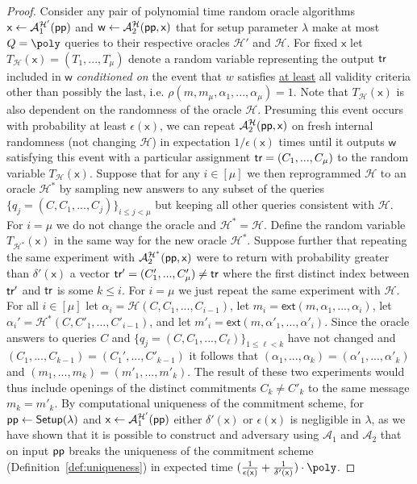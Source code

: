 \begin{proof} 
Consider any pair of polynomial time random oracle algorithms $\mathsf{x} \gets \mathcal{A}_1^{\mathcal{H}'}(\textsf{pp})$ 
and $\mathsf{w} \gets \mathcal{A}_2^{\mathcal{H}}(\textsf{pp}, \mathsf{x})$ that for setup parameter $\lambda$ make at most $Q = \poly$ queries to their respective oracles $\mathcal{H}'$ and $\mathcal{H}$. For fixed $\mathsf{x}$ let $T_\mathcal{H}(\mathsf{x}) = (T_1,...,T_\mu)$ denote a random variable representing the output $\textsf{{tr}}$ included in $\mathsf{w}$ \emph{conditioned on} the event that $w$ satisfies \underline{at least} all validity criteria other than possibly the last, i.e. $\rho(m, m_\mu, \alpha_1,...,\alpha_\mu) = 1$. Note that $T_\mathcal{H}(\mathsf{x})$ is also dependent on the randomness of the oracle $\mathcal{H}$. 
Presuming this event occurs with probability at least $\epsilon(\mathsf{x})$, we can repeat $\mathcal{A}_2^\mathcal{H}(\textsf{pp}, \mathsf{x})$ on fresh internal randomness (not changing $\mathcal{H}$) in expectation $1/\epsilon(\mathsf{x})$ times until it outputs $\mathsf{w}$ satisfying this event with a particular assignment $\textsf{{tr}} = (C_1,...,C_\mu)$ to the random variable $T_\mathcal{H}(\mathsf{x})$. Suppose that for any $i \in [\mu]$ we then reprogrammed $\mathcal{H}$ to an oracle $\mathcal{H}^*$ by sampling new answers to any subset of the queries $\{q_j = (C, C_1,...,C_j)\}_{i \leq j < \mu}$ but keeping all other queries consistent with $\mathcal{H}$.  For $i = \mu$ we do not change the oracle and $\mathcal{H}^* = \mathcal{H}$. Define the random variable $T_\mathcal{H^*}(\mathsf{x})$ in the same way for the new oracle $\mathcal{H}^*$. 
Suppose further that repeating the same experiment with $\mathcal{A}_2^\mathcal{H^*}(\textsf{pp}, \mathsf{x})$ were to return with probability greater than $\delta'(\mathsf{x})$ a vector $\textsf{{tr}}'= (C_1',...,C'_\mu) \neq \textsf{{tr}}$ where the first distinct index between $\textsf{{tr}}'$ and $\textsf{{tr}}$ is some $k \leq i$. 
For $i = \mu$ we just repeat the same experiment with $\mathcal{H}$. For all $i \in [\mu]$ let $\alpha_i = \mathcal{H}(C, C_1,...,C_{i-1})$, let $m_i = \textsf{ext}(m, \alpha_1,...,\alpha_i)$, let $\alpha_i' = \mathcal{H}^*(C, C'_1,...,C'_{i-1})$, and let $m'_i = \textsf{ext}(m, \alpha'_1,...,\alpha'_i)$. Since the oracle answers to queries $C$ and $\{q_j = (C, C_1,...,C_\ell)\}_{1 \leq \ell < k}$ have not changed and $(C_1,...,C_{k-1}) = (C_1',...,C'_{k-1})$ it follows that $(\alpha_1,...,\alpha_k) = (\alpha'_1,...,\alpha'_k)$ and $(m_1,...,m_k) = (m'_1,...,m'_k)$. The result of these two experiments would thus include openings of the distinct commitments $C_k \neq C'_k$ to the same message $m_k = m'_k$. 
By computational uniqueness of the commitment scheme, for $\textsf{pp} \gets \textsf{{Setup}}(\lambda)$ and $\mathsf{x} \gets \mathcal{A}_1^{\mathcal{H}'}(\textsf{pp})$ 
either $\delta'(\mathsf{x})$ or $\epsilon(\mathsf{x})$ is negligible in $\lambda$, as we have shown that it is possible to construct and adversary using $\mathcal{A}_1$ and $\mathcal{A}_2$ that on input $\textsf{pp}$ breaks the uniqueness of the commitment scheme (Definition~\ref{def:uniqueness})
in expected time $(\frac{1}{\epsilon(\mathsf{x})} + \frac{1}{\delta'(\mathsf{x})}) \cdot \mathsf{\poly}$.
 


\end{proof}
